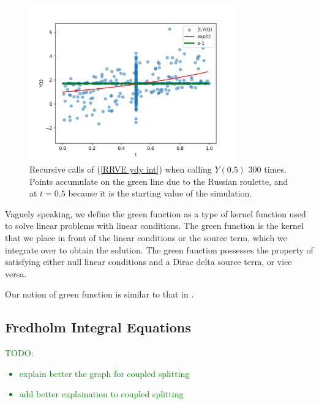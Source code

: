 \begin{example}[$y'=y$ average condition]
    \begin{figure}[h!]
        \centering
        \includegraphics[width=0.8\textwidth]{plots/ydy int.png}
        \caption{Recursive calls of (\ref{RRVE ydy int}) when
            calling $Y(0.5)$ $300$ times. Points accumulate on
            the green line due to the Russian roulette,
            and at  $t=0.5$ because it is the starting
            value of the simulation.
        }
        \label{fig:ydy int}
    \end{figure}

\end{example}

\begin{definition}
    Vaguely speaking, we define the green function as a type
    of kernel function used to solve linear problems with linear
    conditions. The green function is the kernel that we
    place in front of the linear conditions or the source term,
    which we integrate over to obtain the solution. The green
    function possesses the property of satisfying either null
    linear conditions and a Dirac delta source term, or vice versa.
\end{definition}

\begin{related}
    Our notion of green function is similar to that in \cite{hwang_simulationtabulation_2001}.
\end{related}

\subsection{Fredholm Integral Equations}

\textcolor{green}{
    TODO:
    \begin{itemize}
        \item explain better the graph for coupled splitting
        \item add better explaination to coupled splitting
    \end{itemize}
}

